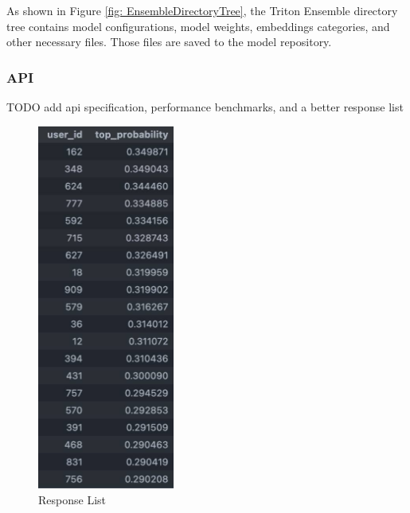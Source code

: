 As shown in Figure \ref{fig: EnsembleDirectoryTree}, the Triton Ensemble directory tree contains model configurations, model weights, embeddings categories, and other necessary files.
Those files are saved to the model repository.

\subsubsection{API}

TODO add api specification, performance benchmarks, and a better response list

\begin{figure}[H]
    \centering
    \includegraphics[width=0.4\textwidth]{assets/response_list.jpg}
    \caption{Response List}
    \label{fig:ResponseList}
\end{figure}


